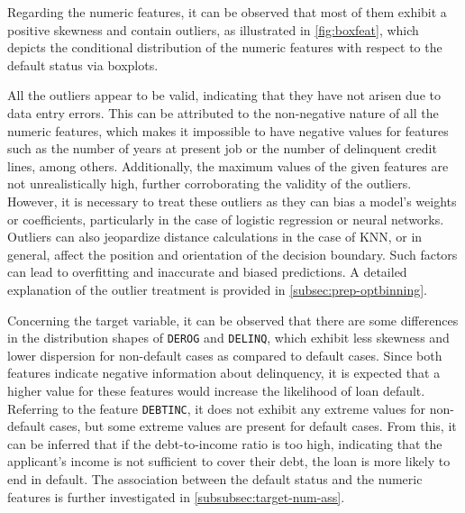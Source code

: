     Regarding the numeric features, it can be observed that most of them exhibit a positive skewness and contain outliers, as illustrated in \autoref{fig:boxfeat}, which depicts the conditional distribution of the numeric features with respect to the default status via boxplots.

    All the outliers appear to be valid, indicating that they have not arisen due to data entry errors.
    This can be attributed to the non-negative nature of all the numeric features, which makes it impossible to have negative values for features such as the number of years at present job or the number of delinquent credit lines, among others.
    Additionally, the maximum values of the given features are not unrealistically high, further corroborating the validity of the outliers.
    However, it is necessary to treat these outliers as they can bias a model's weights or coefficients, particularly in the case of logistic regression or neural networks.
    Outliers can also jeopardize distance calculations in the case of KNN, or in general, affect the position and orientation of the decision boundary.
    Such factors can lead to overfitting and inaccurate and biased predictions.
    A detailed explanation of the outlier treatment is provided in \autoref{subsec:prep-optbinning}.

    Concerning the target variable, it can be observed that there are some differences in the distribution shapes of \texttt{DEROG} and \texttt{DELINQ}, which exhibit less skewness and lower dispersion for non-default cases as compared to default cases.
    Since both features indicate negative information about delinquency, it is expected that a higher value for these features would increase the likelihood of loan default.
    Referring to the feature \texttt{DEBTINC}, it does not exhibit any extreme values for non-default cases, but some extreme values are present for default cases.
    From this, it can be inferred that if the debt-to-income ratio is too high, indicating that the applicant's income is not sufficient to cover their debt, the loan is more likely to end in default.
    The association between the default status and the numeric features is further investigated in \autoref{subsubsec:target-num-ass}.


